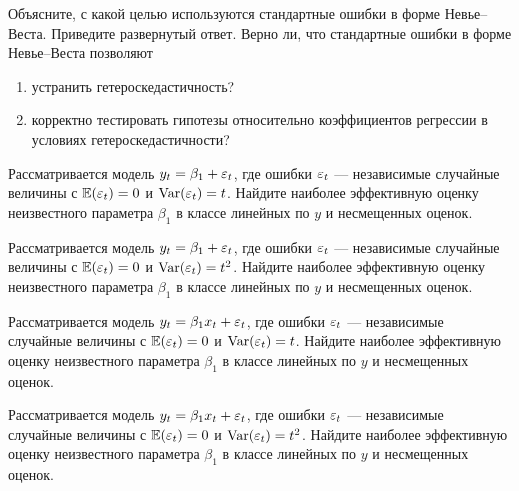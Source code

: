\documentclass[pdftex,11pt,openany]{book}\usepackage[]{graphicx}\usepackage[]{color}
\begin{document}
\begin{solution}
\end{solution}


\begin{problem}
Объясните, с какой целью используются стандартные ошибки в форме Невье–Веста. Приведите развернутый ответ. Верно ли, что стандартные ошибки в форме Невье–Веста позволяют
\begin{enumerate}
\item устранить гетероскедастичность?
\item корректно тестировать гипотезы относительно коэффициентов регрессии в условиях гетероскедастичности? 
\end{enumerate}
\end{problem}

\begin{solution}
\end{solution}


\begin{problem}
Рассматривается модель $y_t=\beta_1+\varepsilon_t$, где ошибки $\varepsilon_t$  --- независимые
случайные величины с $\mathbb{E}(\varepsilon_t)=0$ и $\operatorname{Var}(\varepsilon_t)=t$. Найдите наиболее эффективную
оценку неизвестного параметра $\beta_1$ в классе линейных по $y$ и несмещенных оценок.
\end{problem}
\begin{solution}
\end{solution}

\begin{problem}
Рассматривается модель $y_t=\beta_1+\varepsilon_t$, где ошибки $\varepsilon_t$  --- независимые
случайные величины с $\mathbb{E}(\varepsilon_t)=0$ и $\operatorname{Var}(\varepsilon_t)=t^2$. Найдите наиболее эффективную
оценку неизвестного параметра $\beta_1$ в классе линейных по $y$ и несмещенных оценок.
\end{problem}
\begin{solution}
\end{solution}


\begin{problem}
Рассматривается модель $y_t=\beta_1 x_t+\varepsilon_t$, где ошибки $\varepsilon_t$  --- независимые
случайные величины с $\mathbb{E}(\varepsilon_t)=0$ и $\operatorname{Var}(\varepsilon_t)=t$. Найдите наиболее эффективную
оценку неизвестного параметра $\beta_1$ в классе линейных по $y$ и несмещенных оценок.
\end{problem}
\begin{solution}
\end{solution}


\begin{problem}
Рассматривается модель $y_t=\beta_1 x_t +\varepsilon_t$, где ошибки $\varepsilon_t$  --- независимые
случайные величины с $\mathbb{E}(\varepsilon_t)=0$ и $\operatorname{Var}(\varepsilon_t)=t^2$. Найдите наиболее эффективную
оценку неизвестного параметра $\beta_1$ в классе линейных по $y$ и несмещенных оценок.
\end{problem}
\begin{solution}
\end{solution}
\end{document}
